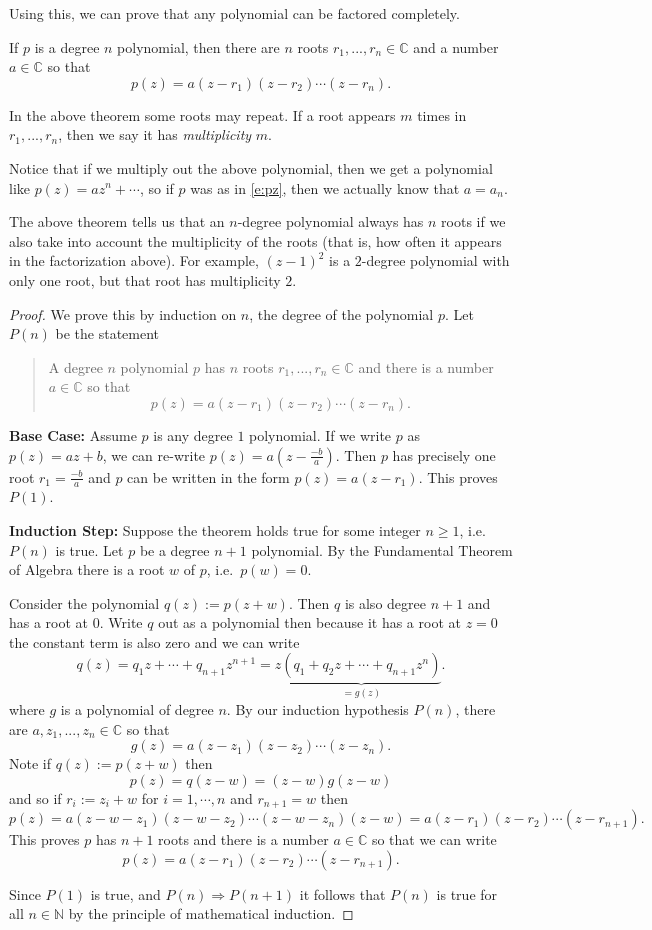 \documentclass[11pt,dvipsnames]{book}
\numberwithin{figure}{section} %
\numberwithin{table}{section} %
\begin{document}
Using this, we can prove that any polynomial can be factored completely.

\begin{theorem}
If $p$ is a degree $n$ polynomial, then there are $n$ roots $r_{1},...,r_{n}\in\mathbb{C}$ and a number $a\in\mathbb{C}$ so that
\[
p(z) = a(z-r_{1})(z-r_{2})\cdots (z-r_{n}).\]
\end{theorem}
In the above theorem some roots may repeat. If a root appears $m$ times in $r_{1},...,r_{n}$, then we say it has {\it multiplicity} $m$.

Notice that if we multiply out the above polynomial, then we get a polynomial like $p(z)=az^{n}+\cdots $, so if $p$ was as in \eqref{e:pz}, then we actually know that $a=a_n$.

The above theorem tells us that an $n$-degree polynomial always has $n$ roots if we also take into account the multiplicity of the roots (that is, how often it appears in the factorization above). For example, $(z-1)^2$ is a $2$-degree polynomial with only one root, but that root has multiplicity $2$.

\begin{proof}
We prove this by induction on \(n\), the degree of the polynomial \(p\).
Let \(P(n)\) be the statement
\begin{quote}
A degree $n$ polynomial \(p\) has $n$ roots $r_{1},...,r_{n}\in\mathbb{C}$ and there is a number $a\in\mathbb{C}$ so that
\[
p(z) = a(z-r_{1})(z-r_{2})\cdots (z-r_{n}).\]
\end{quote}

{\bf Base Case:} Assume \(p\) is any degree \(1\) polynomial.
If we write \(p\) as $p(z)=az+b$, we can re-write $p(z) = a(z-\frac{-b}{a})$.
Then \(p\) has precisely one root \(r_1=\frac{-b}{a}\) and \(p\) can be written in the form \(p(z)=a(z-r_1)\). This proves \(P(1)\).

{\bf Induction Step:}
Suppose the theorem holds true for some integer $n\geq 1$, i.e. \(P(n)\) is true.
Let $p$ be a degree $n+1$ polynomial.
By the Fundamental Theorem of Algebra there is a root $w$ of $p$, i.e.~\(p(w)=0\).

Consider the polynomial $q(z):=p(z+w)$.
Then \(q\) is also degree \(n+1\) and has a root at $0$.
Write \(q\) out as a polynomial then because it has a root at \(z=0\) the constant term is also zero and we can write
\[
q(z) = q_{1}z+\cdots + q_{n+1}z^{n+1}
= z\underbrace{(q_{1}+q_{2}z+\cdots + q_{n+1}z^{n})}_{=g(z)}.
\]
where \(g\) is a polynomial of degree \(n\).
By our induction hypothesis \(P(n)\), there are $a,z_{1},...,z_{n}\in\mathbb{C}$ so that
\[
g(z) = a(z-z_{1})(z-z_{2})\cdots (z-z_{n}).
\]
Note if \(q(z):=p(z+w)\) then
\[
p(z)=q(z-w)=(z-w)g(z-w)
\]
and so if \(r_{i}:=z_{i}+w\) for \(i=1,\cdots, n\) and \(r_{n+1}=w\)
then
\[
p(z) = a(z-w-z_{1})(z-w-z_{2})\cdots (z-w-z_{n})(z-w)
=a(z-r_{1})(z-r_{2})\cdots (z-r_{n+1}).
\]
This proves \(p\) has $n+1$ roots and there is a number $a\in\mathbb{C}$ so that we can write
\[
p(z) = a(z-r_{1})(z-r_{2})\cdots (z-r_{n+1}).\]

Since \(P(1)\) is true, and \(P(n)\Rightarrow P(n+1)\) it follows that \(P(n)\) is true for all \(n\in\mathbb{N}\) by the principle of mathematical induction.
\end{proof}
\end{document}
